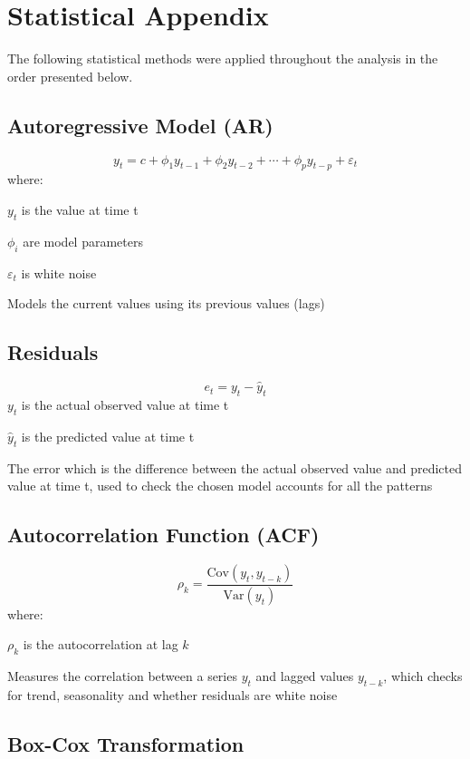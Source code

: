 \documentclass[
]{article}
\begin{document}
\section{Statistical Appendix}\label{statistical-appendix}

The following statistical methods were applied throughout the analysis
in the order presented below.

\subsection{Autoregressive Model (AR)}\label{autoregressive-model-ar}

\[
y_t = c + \phi_1 y_{t-1} + \phi_2 y_{t-2} + \cdots + \phi_p y_{t-p} + \varepsilon_t
\] where:

\(y_t\) is the value at time t

\(\phi_i\) are model parameters

\(\varepsilon_t\) is white noise

Models the current values using its previous values (lags)

\subsection{Residuals}\label{residuals}

\[
e_t = y_t - \hat{y}_t
\] \(y_t\) is the actual observed value at time t

\(\hat{y}_t\) is the predicted value at time t

The error which is the difference between the actual observed value and
predicted value at time t, used to check the chosen model accounts for
all the patterns

\subsection{Autocorrelation Function
(ACF)}\label{autocorrelation-function-acf}

\[
\rho_k = \frac{\text{Cov}(y_t, y_{t-k})}{\text{Var}(y_t)}
\] where:

\(\rho_k\) is the autocorrelation at lag \(k\)

Measures the correlation between a series \(y_t\) and lagged values
\(y_{t-k}\), which checks for trend, seasonality and whether residuals
are white noise

\subsection{Box-Cox Transformation}\label{box-cox-transformation}
\end{document}

